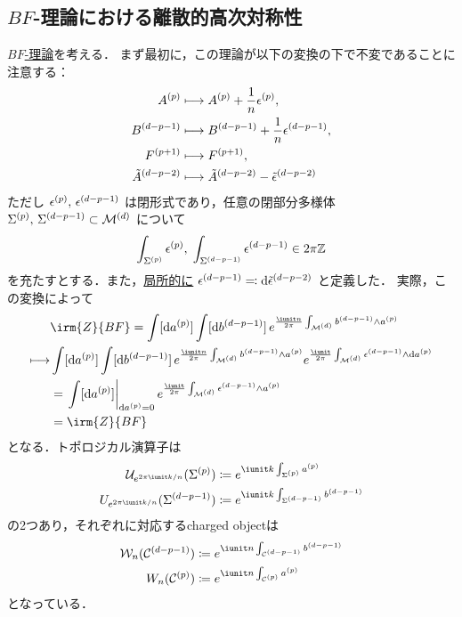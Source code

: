 \documentclass[TQFT_main]{subfiles}
\begin{document}
\subsection{$BF$-理論における離散的高次対称性}

\hyperref[def:BF]{$BF$-理論}を考える．
まず最初に，この理論が以下の変換の下で不変であることに注意する：
\begin{align}
    A^{(p)} &\longmapsto A^{(p)} + \frac{1}{n} \epsilon^{(p)}, \\
    B^{(d-p-1)} &\longmapsto B^{(d-p-1)} + \frac{1}{n} \epsilon^{(d-p-1)}, \\
    F^{(p+1)} &\longmapsto F^{(p+1)}, \\
    \tilde{A}^{(d-p-2)} &\longmapsto \tilde{A}^{(d-p-2)} - \tilde{\epsilon}^{(d-p-2)}
\end{align}
ただし $\epsilon^{(p)},\, \epsilon^{(d-p-1)}$ は閉形式であり，任意の閉部分多様体 $\Sigma^{(p)},\, \Sigma^{(d-p-1)} \subset \mathcal{M}^{(d)}$ について
\begin{align}
    \int_{\Sigma^{(p)}} \epsilon^{(p)},\; \int_{\Sigma^{(d-p-1)}} \epsilon^{(d-p-1)} \in 2\pi \mathbb{Z}
\end{align}
を充たすとする．また，\underline{局所的に} $\epsilon^{(d-p-1)} \eqqcolon \dd{\tilde{\epsilon}^{(d-p-2)}}$ と定義した．
実際，この変換によって
\begin{align}
    &\irm{Z}{BF} 
    = \int [\dd{\hg{a}{p}}] \int [\dd{\hg{b}{d-p-1}}]\, e^{\frac{\iunit n}{2\pi} \int_{\mfdcal{M}{d}} \hg{b}{d-p-1} \wedge \hg{a}{p}} \\
    \lmto 
    & \int [\dd{\hg{a}{p}}] \int [\dd{\hg{b}{d-p-1}}]\, e^{\frac{\iunit n}{2\pi} \int_{\mfdcal{M}{d}} \hg{b}{d-p-1} \wedge \hg{a}{p}} e^{\frac{\iunit}{2\pi} \int_{\mfdcal{M}{d}} \hg{\epsilon}{d-p-1} \wedge \dd{\hg{a}{p}}} \\
    &= \eval{\int [\dd{\hg{a}{p}}]}_{\dd{\hg{a}{p}} = 0} e^{\frac{\iunit}{2\pi} \int_{\mfdcal{M}{d}} \hg{\epsilon}{d-p-1} \wedge \hg{a}{p}} \\
    &= \irm{Z}{BF} 
\end{align}
となる．トポロジカル演算子は
\begin{align}
    \mathcal{U}_{e^{2\pi \iunit k/n}}(\mfd{\Sigma}{p}) &\coloneqq e^{\iunit k \int_{\mfd{\Sigma}{p}} \hg{a}{p}} \\
    U_{e^{2\pi \iunit k/n}}(\mfd{\Sigma}{d-p-1}) &\coloneqq e^{\iunit k \int_{\mfd{\Sigma}{d-p-1}} \hg{b}{d-p-1}}
\end{align}
の2つあり，それぞれに対応するcharged objectは
\begin{align}
    \mathcal{W}_n (\mfdcal{C}{d-p-1}) &\coloneqq e^{\iunit n \int_{\mfdcal{C}{d-p-1}} \hg{b}{d-p-1}} \\
    W_n (\mfdcal{C}{p}) &\coloneqq e^{\iunit n \int_{\mfdcal{C}{p}} \hg{a}{p}}
\end{align}
となっている．
\end{document}
